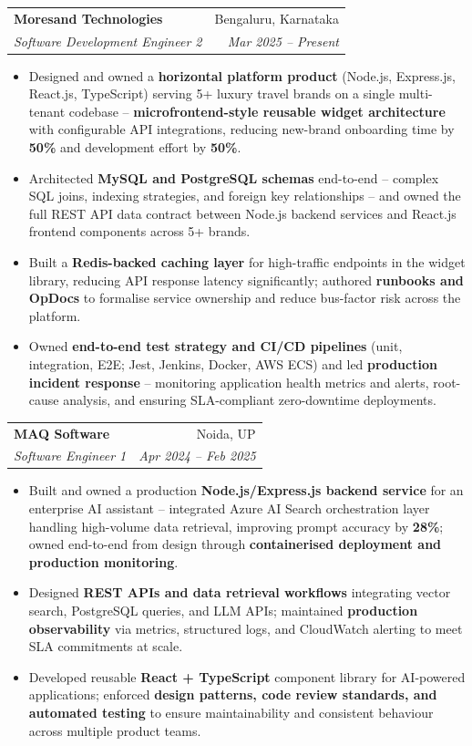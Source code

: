 \documentclass[a4paper,20pt]{article}
\makeatletter
\newcommand{\resumeSubheading}[4]{\vspace{-1pt}\item\begin{tabular*}{0.97\textwidth}{l@{\extracolsep{\fill}}r}\textbf{#1} & #2 \\\textit{#3} & \textit{#4} \\\end{tabular*}\vspace{-5pt}}
\newcommand{\resumeItemListStart}{\begin{itemize}}
\newcommand{\resumeItemListEnd}{\end{itemize}\vspace{-5pt}}
\makeatother
\begin{document}
    \resumeSubheading
      {Moresand Technologies}{Bengaluru, Karnataka}
      {Software Development Engineer 2}{Mar 2025 -- Present}
      \resumeItemListStart
        \item\small{Designed and owned a \textbf{horizontal platform product} (Node.js, Express.js, React.js, TypeScript) serving 5+ luxury travel brands on a single multi-tenant codebase -- \textbf{microfrontend-style reusable widget architecture} with configurable API integrations, reducing new-brand onboarding time by \textbf{50\%} and development effort by \textbf{50\%}.}
        \item\small{Architected \textbf{MySQL and PostgreSQL schemas} end-to-end -- complex SQL joins, indexing strategies, and foreign key relationships -- and owned the full REST API data contract between Node.js backend services and React.js frontend components across 5+ brands.}
        \item\small{Built a \textbf{Redis-backed caching layer} for high-traffic endpoints in the widget library, reducing API response latency significantly; authored \textbf{runbooks and OpDocs} to formalise service ownership and reduce bus-factor risk across the platform.}
        \item\small{Owned \textbf{end-to-end test strategy and CI/CD pipelines} (unit, integration, E2E; Jest, Jenkins, Docker, AWS ECS) and led \textbf{production incident response} -- monitoring application health metrics and alerts, root-cause analysis, and ensuring SLA-compliant zero-downtime deployments.}
      \resumeItemListEnd

    \resumeSubheading
      {MAQ Software}{Noida, UP}
      {Software Engineer 1}{Apr 2024 -- Feb 2025}
      \resumeItemListStart
        \item\small{Built and owned a production \textbf{Node.js/Express.js backend service} for an enterprise AI assistant -- integrated Azure AI Search orchestration layer handling high-volume data retrieval, improving prompt accuracy by \textbf{28\%}; owned end-to-end from design through \textbf{containerised deployment and production monitoring}.}
        \item\small{Designed \textbf{REST APIs and data retrieval workflows} integrating vector search, PostgreSQL queries, and LLM APIs; maintained \textbf{production observability} via metrics, structured logs, and CloudWatch alerting to meet SLA commitments at scale.}
        \item\small{Developed reusable \textbf{React + TypeScript} component library for AI-powered applications; enforced \textbf{design patterns, code review standards, and automated testing} to ensure maintainability and consistent behaviour across multiple product teams.}
      \resumeItemListEnd
\end{document}
